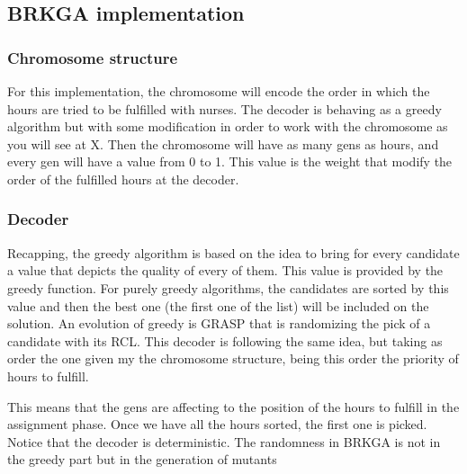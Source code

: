 \subsection{BRKGA implementation}

\subsubsection{Chromosome structure}

For this implementation, the chromosome will encode the order in which the hours are tried to be fulfilled with nurses. The decoder is behaving as a greedy algorithm but with some modification in order to work with the chromosome as you will see at X. Then the chromosome will have as many gens as hours, and every gen will have a value from 0 to 1. This value is the weight that modify the order of the fulfilled hours at the decoder.



\subsubsection{Decoder}

Recapping, the greedy algorithm is based on the idea to bring for every candidate a value that depicts the quality of every of them. This value is provided by the greedy function. For purely greedy algorithms, the candidates are sorted by this value and then the best one (the first one of the list) will be included on the solution. An evolution of greedy is GRASP that is randomizing the pick of a candidate with its RCL. This decoder is following the same idea, but taking as order the one given my the chromosome structure, being this order the priority of hours to fulfill.

This means that the gens are affecting to the position of the hours to fulfill in the assignment phase. Once we have all the hours sorted, the first one is picked. Notice that the decoder is deterministic. The randomness in BRKGA is not in the greedy part but in the generation of mutants



\pagebreak